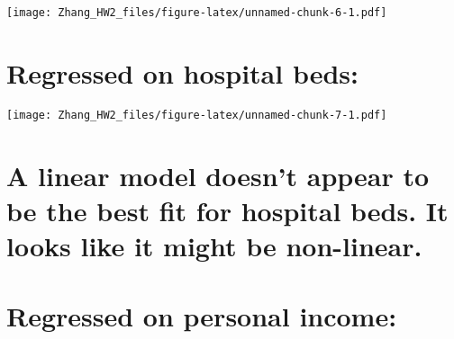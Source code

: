 \documentclass[]{article}
\newenvironment{Shaded}{\begin{snugshade}}{\end{snugshade}}
\newcommand{\DataTypeTok}[1]{\textcolor[rgb]{0.13,0.29,0.53}{#1}}
\newcommand{\DecValTok}[1]{\textcolor[rgb]{0.00,0.00,0.81}{#1}}
\newcommand{\FloatTok}[1]{\textcolor[rgb]{0.00,0.00,0.81}{#1}}
\newcommand{\KeywordTok}[1]{\textcolor[rgb]{0.13,0.29,0.53}{\textbf{#1}}}
\newcommand{\NormalTok}[1]{#1}
\newcommand{\OperatorTok}[1]{\textcolor[rgb]{0.81,0.36,0.00}{\textbf{#1}}}
\newcommand{\StringTok}[1]{\textcolor[rgb]{0.31,0.60,0.02}{#1}}
\begin{document}
\texttt{[image: Zhang\_HW2\_files/figure-latex/unnamed-chunk-6-1.pdf]}

\hypertarget{regressed-on-hospital-beds}{%
\section{Regressed on hospital beds:}\label{regressed-on-hospital-beds}}

\begin{Shaded}
\end{Shaded}

\texttt{[image: Zhang\_HW2\_files/figure-latex/unnamed-chunk-7-1.pdf]}

\hypertarget{a-linear-model-doesnt-appear-to-be-the-best-fit-for-hospital-beds.-it-looks-like-it-might-be-non-linear.}{%
\section{A linear model doesn't appear to be the best fit for hospital
beds. It looks like it might be
non-linear.}\label{a-linear-model-doesnt-appear-to-be-the-best-fit-for-hospital-beds.-it-looks-like-it-might-be-non-linear.}}

\hypertarget{regressed-on-personal-income}{%
\section{Regressed on personal
income:}\label{regressed-on-personal-income}}

\begin{Shaded}
\end{Shaded}
\end{document}

